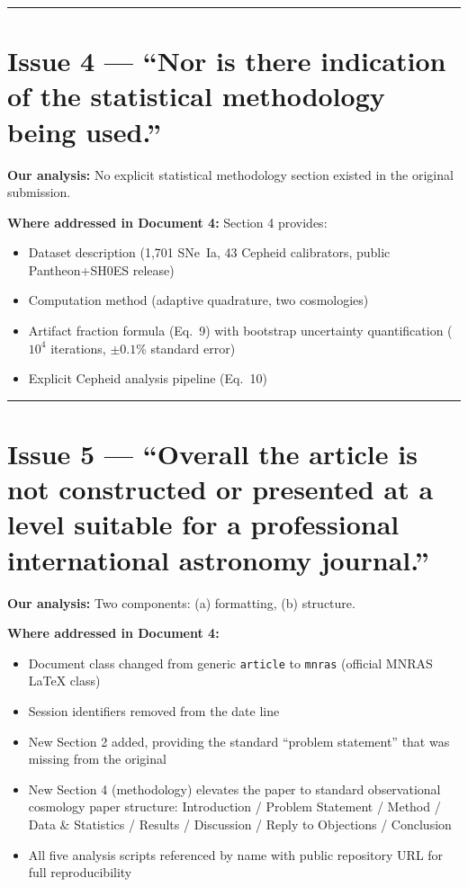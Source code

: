 \documentclass[12pt,a4paper]{article}
\begin{document}
\bigskip
\hrule
\bigskip

\section*{Issue 4 — ``Nor is there indication of the statistical
methodology being used.''}

\textbf{Our analysis:} No explicit statistical methodology section
existed in the original submission.

\textbf{Where addressed in Document 4:}
Section 4 provides:
\begin{itemize}[noitemsep]
    \item Dataset description (1,701 SNe~Ia, 43 Cepheid calibrators,
    public Pantheon+SH0ES release)
    \item Computation method (adaptive quadrature, two cosmologies)
    \item Artifact fraction formula (Eq.~9) with bootstrap uncertainty
    quantification ($10^4$ iterations, $\pm0.1$\% standard error)
    \item Explicit Cepheid analysis pipeline (Eq.~10)
\end{itemize}

\bigskip
\hrule
\bigskip

\section*{Issue 5 — ``Overall the article is not constructed or
presented at a level suitable for a professional international
astronomy journal.''}

\textbf{Our analysis:} Two components: (a) formatting, (b) structure.

\textbf{Where addressed in Document 4:}
\begin{itemize}[noitemsep]
    \item Document class changed from generic \texttt{article} to
    \texttt{mnras} (official MNRAS LaTeX class)
    \item Session identifiers removed from the date line
    \item New Section 2 added, providing the standard ``problem
    statement'' that was missing from the original
    \item New Section 4 (methodology) elevates the paper to standard
    observational cosmology paper structure:
    Introduction / Problem Statement / Method / Data \& Statistics /
    Results / Discussion / Reply to Objections / Conclusion
    \item All five analysis scripts referenced by name with public
    repository URL for full reproducibility
\end{itemize}
\end{document}
